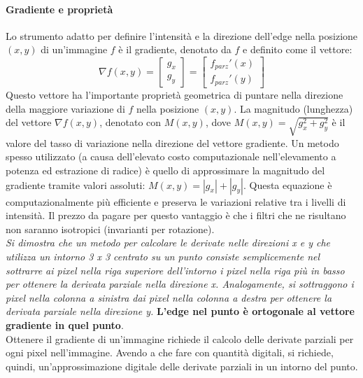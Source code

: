 \documentclass[12pt]{article}
\begin{document}
\paragraph{Gradiente e proprietà}
Lo strumento adatto per definire l'intensità e la direzione dell'edge nella posizione $(x, y)$
di un'immagine $f$ è il gradiente, denotato da $f$ e definito come il vettore:
$$\nabla f(x,y) = \begin{bmatrix}
        g_x \\
        g_y
    \end{bmatrix} = \begin{bmatrix}
        {f_{parz}'(x)} \\
        {f_{parz}'(y)}
    \end{bmatrix}
$$
Questo vettore ha l'importante proprietà geometrica di puntare nella direzione della maggiore variazione di $f $ nella posizione $(x, y)$.
La magnitudo (lunghezza) del vettore $\nabla f(x,y)$, denotato con $M(x, y)$, dove $M(x, y)=\sqrt{g_x^2+g_y^2}$ è il valore del tasso di variazione nella direzione del vettore gradiente. Un metodo spesso utilizzato (a causa dell'elevato costo computazionale nell'elevamento a potenza ed estrazione di radice) è quello di approssimare la magnitudo del gradiente tramite valori assoluti: $M(x, y)=|g_x|+|g_y|$. Questa equazione è computazionalmente più efficiente e preserva le variazioni relative tra i livelli di intensità. Il prezzo da pagare per questo vantaggio è che i filtri che ne risultano non saranno isotropici (invarianti per rotazione).
\\\textit{Si dimostra che un metodo per calcolare le derivate nelle direzioni x e y che utilizza un intorno 3 x 3 centrato su un punto consiste semplicemente nel sottrarre ai pixel nella riga superiore dell'intorno i
    pixel nella riga più in basso per ottenere la derivata parziale nella direzione x. Analogamente, si sottraggono i pixel nella colonna a sinistra dai pixel nella colonna a destra per ottenere la derivata parziale nella direzione y.}
\textbf{L'edge nel punto è ortogonale al vettore gradiente in quel punto}.
\\Ottenere il gradiente di un'immagine richiede il calcolo delle derivate parziali per ogni pixel nell'immagine. Avendo a che fare con quantità digitali, si richiede, quindi, un'approssimazione digitale delle derivate parziali in un intorno del punto.
\end{document}
